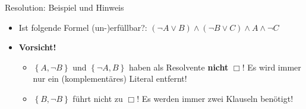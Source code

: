 \begin{frame}{Resolution: Beispiel und Hinweis}
	\begin{itemize}
		\item Ist folgende Formel (un-)erfüllbar?: $(\neg A \lor B) \land (\neg B \lor C) \land A \land \neg C$
		\item \textbf{Vorsicht!} 
		\begin{itemize}
			\item $\left\{A, \neg B\right\}$ und $\left\{\neg A, B\right\}$ haben als Resolvente \textbf{nicht} $\Box$! Es wird immer nur ein (komplementäres) Literal entfernt!
			\item $\left\{B, \neg B\right\}$ führt nicht zu $\Box$! Es werden immer zwei Klauseln benötigt!
		\end{itemize}
		
	\end{itemize}
\end{frame}

